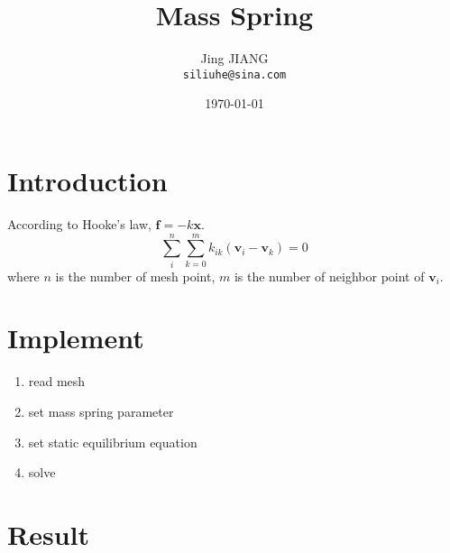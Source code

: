 \documentclass{article}
\title{Mass Spring} %
\author{Jing JIANG\\ \texttt{siliuhe@sina.com}} %
\date{%
  \today} %
\begin{document}
\maketitle %


\section*{Introduction} %

According to Hooke's law, $\bm{f} = -k\bm{x}$.
$$\sum_i^n{\sum_{k=0}^{m}{k_{ik}(\bm{v}_i-\bm{v}_k)}=0}$$
where $n$ is the number of mesh point, $m$ is the number of neighbor point of $\bm{v}_i$.
\section*{Implement}
\begin{enumerate}
\item read mesh
\item set mass spring parameter
\item set static equilibrium equation
\item solve
\end{enumerate}
\section*{Result}
\end{document}
